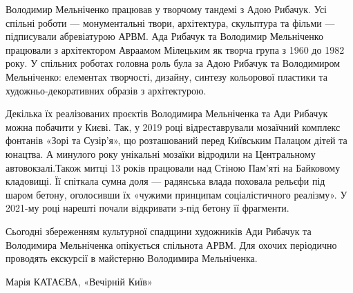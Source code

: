 Володимир Мельніченко працював у творчому тандемі з Адою Рибачук. Усі спільні
роботи — монументальні твори, архітектура, скульптура та фільми — підписували
абревіатурою АРВМ. Ада Рибачук та Володимир Мельніченко працювали з
архітектором Авраамом Мілецьким як творча група з 1960 до 1982 року. У спільних
роботах головна роль була за Адою Рибачук та Володимиром Мельніченко: елементах
творчості, дизайну, синтезу кольорової пластики та художньо-декоративних
образів з архітектурою.

Декілька їх реалізованих проєктів Володимира Мельніченка та Ади Рибачук можна
побачити у Києві. Так, у 2019 році відреставрували мозаїчний комплекс фонтанів
«Зорі та Сузір’я», що розташований перед Київським Палацом дітей та юнацтва. А
минулого року унікальні мозаїки відродили на Центральному автовокзалі.Також
митці 13 років працювали над Стіною Пам’яті на Байковому кладовищі. Її спіткала
сумна доля — радянська влада поховала рельєфи під шаром бетону, оголосивши їх
«чужими принципам соціалістичного реалізму». У 2021-му році нарешті почали
відкривати з-під бетону її фрагменти.

Сьогодні збереженням культурної спадщини художників Ади Рибачук та Володимира
Мельніченка опікується спільнота АРВМ. Для охочих періодично проводять
екскурсії в майстерню Володимира Мельніченка.

Марія КАТАЄВА, «Вечірній Київ»

